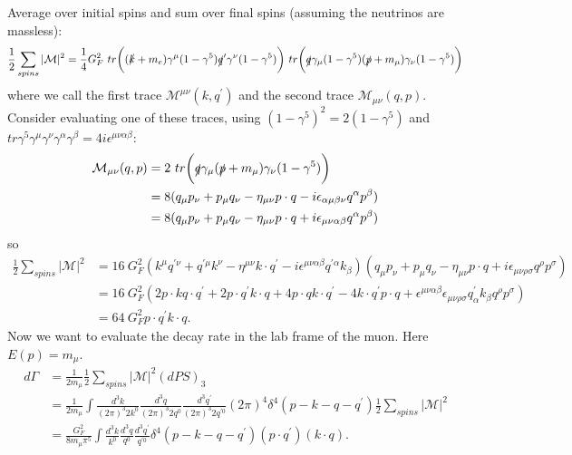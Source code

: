 \documentclass[a4paper,12pt]{article}
\begin{document}
Average over initial spins and sum over final spins (assuming the neutrinos are massless):
\begin{equation}
    \frac{1}{2} \sum_{spins} |\mathcal{M}|^2 = \frac{1}{4}G_F^2\ tr\bigg((\slashed{k}+m_e)\gamma^\mu(1-\gamma^5)\slashed{q}^\prime\gamma^\nu(1-\gamma^5)\bigg)\ tr\bigg(\slashed{q}\gamma_\mu(1-\gamma^5)(\slashed{p}+m_\mu)\gamma_\nu(1-\gamma^5)\bigg)
\end{equation}
where we call the first trace $\mathcal{M}^{\mu \nu}(k,q^\prime)$ and the second trace $\mathcal{M}_{\mu \nu}(q,p)$. Consider evaluating one of these traces, using $(1-\gamma^5)^2 = 2(1-\gamma^5)$ and $tr\gamma^5\gamma^\mu \gamma^\nu \gamma^\alpha \gamma^\beta = 4i\epsilon^{\mu \nu \alpha \beta}$:
\begin{equation}
\begin{split}
    \mathcal{M}_{\mu \nu}(q,p) &= 2\ tr\bigg( \slashed{q}\gamma_\mu(\slashed{p} + m_\mu)\gamma_\nu(1-\gamma^5)\bigg)\\
    &= 8(q_\mu p_\nu + p_\mu q_\nu - \eta_{\mu \nu} p \cdot q - i \epsilon_{\alpha \mu \beta \nu} q^\alpha p^\beta) \\
    &= 8(q_\mu p_\nu + p_\mu q_\nu - \eta_{\mu \nu} p \cdot q + i \epsilon_{\mu \nu \alpha \beta} q^\alpha p^\beta) 
\end{split}
\end{equation}
so
\begin{equation}
\begin{split}
\frac{1}{2}\sum_{spins}|\mathcal{M}|^2 &= 16\ G_F^2(k^\mu q^{\prime \nu} + q^{\prime \mu} k^\nu - \eta^{\mu \nu} k \cdot q^\prime - i \epsilon^{\mu \nu \alpha \beta} q^{\prime \alpha} k_\beta)(q_\mu p_\nu + p_\mu q_\nu - \eta_{\mu \nu} p \cdot q + i \epsilon_{\mu \nu \rho \sigma} q^\rho p^\sigma) \\
&= 16\ G_F^2(2p\cdot k q \cdot q^\prime + 2 p \cdot q^\prime k \cdot q + 4 p \cdot q k \cdot q^\prime - 4 k \cdot q^\prime p \cdot q + \epsilon^{\mu \nu \alpha \beta} \epsilon_{\mu \nu \rho \sigma} q^\prime_\alpha k_\beta q^\rho p^\sigma) \\
&= 64\ G_F^2 p \cdot q^\prime k \cdot q.
\end{split}
\end{equation}
Now we want to evaluate the decay rate in the lab frame of the muon. Here $E(p) = m_\mu$.
\begin{equation}
\begin{split}
d\Gamma &= \frac{1}{2m_\mu}\frac{1}{2}\sum_{spins}|\mathcal{M}|^2(dPS)_3 \\
& = \frac{1}{2m_\mu} \int \frac{d^3k}{(2\pi)^3 2k^0}\frac{d^3q}{(2\pi)^3 2q^0}\frac{d^3q^\prime}{(2\pi)^3 2q^{\prime 0}}(2\pi)^4\delta^4(p-k-q-q^\prime)\frac{1}{2}\sum_{spins}|\mathcal{M}|^2 \\
&= \frac{G_F^2}{8 m_\mu \pi^5} \int \frac{d^3k}{k^0} \frac{d^3q}{q^0} \frac{d^3q^\prime}{q^{\prime 0}} \delta^4(p-k-q-q^\prime)(p \cdot q^\prime)(k \cdot q).
\end{split}
\end{equation}
\end{document}
